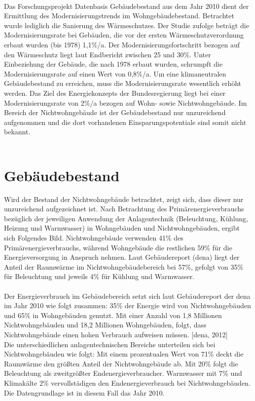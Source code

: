 \\
Das Forschungsprojekt Datenbasis Gebäudebestand aus dem Jahr 2010 dient der Ermittlung des Modernisierungstrends im Wohngebäudebestand. Betrachtet wurde lediglich die Sanierung des Wärmeschutzes. Der Studie zufolge beträgt die Modernisierungsrate bei Gebäuden, die vor der ersten Wärmeschutzverordnung erbaut wurden (bis 1978) 1,1\%/a. Der Modernisierungsfortschritt bezogen auf den Wärmeschutz liegt laut Endbericht zwischen 25 und 30\%. Unter Einbeziehung der Gebäude, die nach 1978 erbaut wurden, schrumpft die Modernisierungsrate auf einen Wert von 0,8\%/a. Um eine klimaneutralen Gebäudebestand zu erreichen, muss die Modernisierungsrate wesentlich erhöht werden. Das Ziel des Energiekonzepts der Bundesregierung liegt bei einer Modernisierungsrate von 2\%/a bezogen auf Wohn- sowie Nichtwohngebäude.
Im Bereich der Nichtwohngebäude ist der Gebäudebestand nur unzureichend aufgenommen und die dort vorhandenen Einsparungspotentiale sind somit nicht bekannt. \\
\\

\chapter{Gebäudebestand}
\label{cha:Gebäudebestand}

Wird der Bestand der Nichtwohngebäude betrachtet, zeigt sich, dass dieser nur unzureichend aufgezeichnet ist. 
Nach Betrachtung des Primärenergieverbrauchs bezüglich der jeweiligen Anwendung der Anlagentechnik (Beleuchtung, Kühlung, Heizung und Warmwasser) in Wohngebäuden und Nichtwohngebäuden, ergibt sich Folgendes Bild. Nichtwohngebäude verwenden 41\% des Primärenergieverbrauchs, während Wohngebäude die restlichen 59\% für die Energieversorgung in Anspruch nehmen. Laut Gebäudereport (dena) liegt der Anteil der Raumwärme im Nichtwohngebäudebereich bei 57\%, gefolgt von 35\% für Beleuchtung und jeweils 4\% für Kühlung und Warmwasser.\\
\\
Der Energieverbrauch im Gebäudebereich setzt sich laut Gebäudereport der dena im Jahr 2010 wie folgt zusammen: 35\% der Energie wird von Nichtwohngebäuden und 65\% in Wohngebäuden genutzt. Mit einer Anzahl von 1,8 Millionen Nichtwohngebäuden und 18,2 Millionen Wohngebäuden, folgt, dass Nichtwohngebäude einen hohen Verbrauch aufweisen müssen. [dena, 2012]\\
Die unterschiedlichen anlagentechnischen Bereiche unterteilen sich bei Nichtwohngebäuden wie folgt: Mit einem prozentualen Wert von 71\% deckt die Raumwärme den größten Anteil der Nichtwohngebäude ab. Mit 20\% folgt die Beleuchtung als zweitgrößter Endenergieverbraucher. Warmwasser mit 7\% und Klimakälte 2\% vervollstädigen den Endenergieverbrauch bei Nichtwohngebäuden. Die Datengrundlage ist in diesem Fall das Jahr 2010.\\